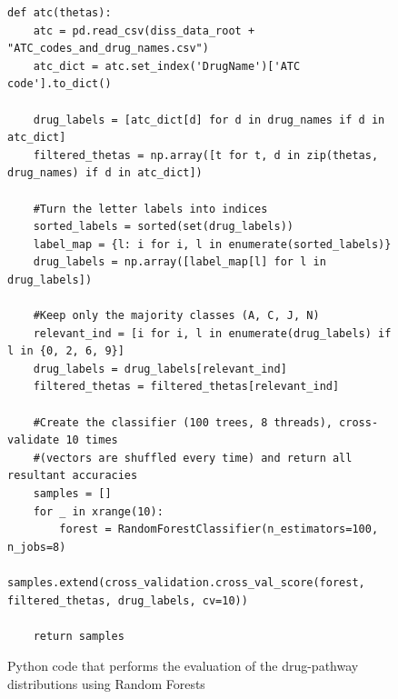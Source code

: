 \documentclass[12pt,a4paper,twoside,openright]{report}
\begin{document}
\begin{figure}
\begin{Verbatim}[fontsize=\scriptsize]
def atc(thetas):
    atc = pd.read_csv(diss_data_root + "ATC_codes_and_drug_names.csv")
    atc_dict = atc.set_index('DrugName')['ATC code'].to_dict()
    
    drug_labels = [atc_dict[d] for d in drug_names if d in atc_dict]
    filtered_thetas = np.array([t for t, d in zip(thetas, drug_names) if d in atc_dict])
    
    #Turn the letter labels into indices
    sorted_labels = sorted(set(drug_labels))
    label_map = {l: i for i, l in enumerate(sorted_labels)}
    drug_labels = np.array([label_map[l] for l in drug_labels])
    
    #Keep only the majority classes (A, C, J, N)
    relevant_ind = [i for i, l in enumerate(drug_labels) if l in {0, 2, 6, 9}]
    drug_labels = drug_labels[relevant_ind]
    filtered_thetas = filtered_thetas[relevant_ind]

    #Create the classifier (100 trees, 8 threads), cross-validate 10 times
    #(vectors are shuffled every time) and return all resultant accuracies
    samples = []
    for _ in xrange(10):
        forest = RandomForestClassifier(n_estimators=100, n_jobs=8)
        samples.extend(cross_validation.cross_val_score(forest, filtered_thetas, drug_labels, cv=10))
    
    return samples
\end{Verbatim}
\caption{Python code that performs the evaluation of the drug-pathway distributions using Random Forests}
\label{fig:atc-python}
\end{figure}

\end{document}
